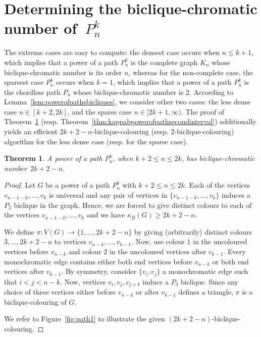 \documentclass{article}
\newtheorem{theorem}{Theorem}
\begin{document}
\section{Determining the biclique-chromatic number of~$P_{n}^{k}$}
\label{sec:kappabpowerofpath}

The extreme cases are easy to compute: the densest case occurs when
$n \leq k + 1$, which implies that a power of a path $P_n^k$ is the complete
graph $K_n$ whose biclique-chromatic number is its order $n$, whereas for the non-complete case, the
sparsest case $P_n^k$ occurs when $k = 1$, which implies that a power of a path
$P_n^k$ is the chordless path $P_n$ whose biclique-chromatic number is 2.
According to Lemma~\ref{lem:powerofpathsbicliques}, we consider other two cases:
the less dense case $n \in [k + 2, 2k]$, and the sparse case $n \in [2k + 1,
\infty)$. The proof of
Theorem~\ref{thm:kappabpowerofpathfirstinterval} (resp.
Theorem~\ref{thm:kappabpowerofpathsecondinterval})
additionally yields an efficient $2k+2-n$-biclique-colouring (resp.
2-biclique-colouring) algorithm for the less dense case (resp. for the sparse
case).


\begin{theorem}
\label{thm:kappabpowerofpathfirstinterval}
 A power of a path $P_n^k$, when $k + 2 \leq n \leq 2k$, has
 biclique-chromatic number~$2k + 2 - n$.
\end{theorem}

\begin{proof}
Let $G$ be a power of a path $P_{n}^{k}$ with $k + 2 \leq n \leq 2k$.
Each of the vertices $v_{n-1-k}, \ldots, v_k$ is universal and any pair of
vertices in $\{v_{n-1-k},\ldots,v_k\}$ induces a $P_{2}$ biclique in the
graph. Hence, we are forced to give distinct colours to each of the vertices
$v_{n-1-k}, \ldots, v_k$ and we have $\kappa_{B}(G) \geq 2k + 2 - n$.
 
We define $\pi:V(G)\rightarrow\{1, \ldots, 2k + 2 - n\}$ by giving
(arbitrarily) distinct colours $3, \ldots, 2k + 2 - n$ to vertices $v_{n - k},
\ldots, v_{k - 1}$. Now, use colour $1$ in the uncoloured vertices before $v_{n
- k}$ and colour $2$ in the uncoloured vertices after $v_{k - 1}$. 
Every monochromatic edge contains either both end vertices before $v_{n - k}$ or
both end vertices after $v_{k - 1}$. By symmetry, consider $\{v_i, v_j\}$ a
monochromatic edge such that $i < j < n - k$. Now, vertices $v_i, v_j, v_{j +
k}$ induce a $P_3$ biclique. Since any choice of three vertices either before
$v_{n - k}$ or after $v_{k - 1}$ defines a triangle, $\pi$ is a
biclique-colouring of $G$.

We refer to Figure~\ref{fig:path1} to illustrate the
given $(2k + 2 - n)$-biclique-colouring.
\end{proof}
\end{document}
